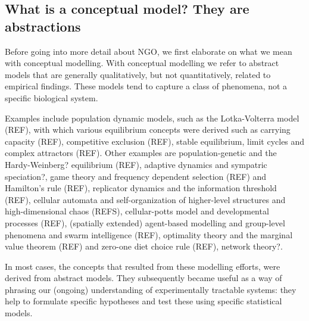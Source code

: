 \subsection{What is a conceptual model? They are abstractions}

Before going into more detail about NGO, we first elaborate on what we mean with conceptual modelling. With conceptual modelling we refer to abstract models that are generally qualitatively, but not quantitatively, related to empirical findings. These models tend to capture a class of phenomena, not a specific biological system.

Examples include population dynamic models, such as the Lotka-Volterra model (REF), with which various equilibrium concepts were derived such as carrying capacity (REF), competitive exclusion (REF), stable equilibrium, limit cycles and complex attractors (REF). Other examples are population-genetic and the Hardy-Weinberg? equilibrium (REF), adaptive dynamics and sympatric speciation?, game theory and frequency dependent selection (REF) and Hamilton’s rule (REF), replicator dynamics and the information threshold (REF), cellular automata and self-organization of higher-level structures and high-dimensional chaos (REFS), cellular-potts model and developmental processes (REF), (spatially extended) agent-based modelling and group-level phenomena and swarm intelligence (REF), optimality theory and the marginal value theorem (REF) and zero-one diet choice rule (REF), network theory?.

In most cases, the concepts that resulted from these modelling efforts, were derived from abstract models. They subsequently became useful as a way of phrasing our (ongoing) understanding of experimentally tractable systems: they help to formulate specific hypotheses and test these using specific statistical models.
  